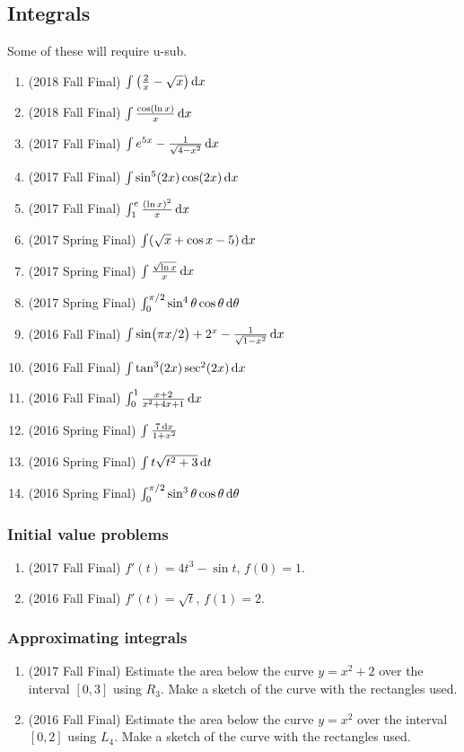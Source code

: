 \documentclass[10pt]{scrartcl}
\begin{document}
\subsection{Integrals}
Some of these will require u-sub. 
\begin{enumerate}
\item (2018 Fall Final) $\int \left( \frac 2x - \sqrt{x} \right) \dif x$
\item (2018 Fall Final) $\int \frac{\cos(\ln x)}{x} \dif x$
\item (2017 Fall Final) $\int e^{5x} - \frac{1}{\sqrt{4-x^2}} \dif x$
\item (2017 Fall Final) $\int \sin^5(2x) \cos(2x) \dif x$
\item (2017 Fall Final) $\int_1^e \frac{(\ln x)^2}{x} \dif x$
\item (2017 Spring Final) $\int (\sqrt x + \cos x - 5) \dif x$
\item (2017 Spring Final) $\int \frac{\sqrt{\ln x}}{x} \dif x$
\item (2017 Spring Final) $\int_0^{\pi/2} \sin^4 \theta \cos \theta \dif \theta$
\item (2016 Fall Final) $\int \sin(\pi x/ 2) + 2^x - \frac{1}{\sqrt{1-x^2}} \dif x$
\item (2016 Fall Final) $\int \tan^3(2x) \sec^2(2x) \dif x$
\item (2016 Fall Final) $\int_0^1 \frac{x+2}{x^2+4x+1} \dif x$
\item (2016 Spring Final) $\int \frac{7 \dif x}{1+x^2}$
\item (2016 Spring Final) $\int t \sqrt{t^2 + 3} \dif t$
\item (2016 Spring Final) $\int_0^{\pi/2} \sin^3 \theta \cos \theta \dif \theta$
\end{enumerate}

\subsubsection{Initial value problems}
\begin{enumerate}
\item (2017 Fall Final) $f'(t) = 4t^3 - \sin t$, $f(0) = 1$. 
\item (2016 Fall Final) $f'(t) = \sqrt{t}$, $f(1) = 2$.
\end{enumerate}


\subsubsection{Approximating integrals}
\begin{enumerate}
\item (2017 Fall Final) Estimate the area below the curve $y = x^2 + 2$ over the interval $[0, 3]$ using $R_3$. Make a sketch of the curve with the rectangles used.
\item (2016 Fall Final) Estimate the area below the curve $y = x^2$ over the interval $[0, 2]$ using $L_4$. Make a sketch of the curve with the rectangles used.
\end{enumerate}
\end{document}
